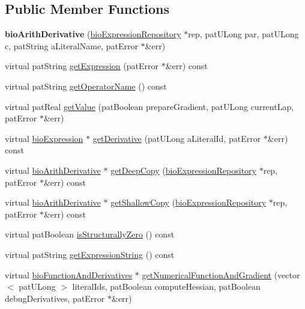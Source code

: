 \subsection*{Public Member Functions}
\begin{DoxyCompactItemize}
\item 
\mbox{\label{classbio_arith_derivative_a765e22a6898f15287928b1ef0758cca4}} 
{\bfseries bio\+Arith\+Derivative} (\hyperlink{classbio_expression_repository}{bio\+Expression\+Repository} $\ast$rep, pat\+U\+Long par, pat\+U\+Long c, pat\+String a\+Literal\+Name, pat\+Error $\ast$\&err)
\item 
virtual pat\+String \hyperlink{classbio_arith_derivative_a5cdf6c4903ec8123b30c0d2ce059718d}{get\+Expression} (pat\+Error $\ast$\&err) const
\item 
virtual pat\+String \hyperlink{classbio_arith_derivative_ac8efdaec7482845045144e134884769a}{get\+Operator\+Name} () const
\item 
virtual pat\+Real \hyperlink{classbio_arith_derivative_a332059cd224467b4a687d39ac705f269}{get\+Value} (pat\+Boolean prepare\+Gradient, pat\+U\+Long current\+Lap, pat\+Error $\ast$\&err)
\item 
virtual \hyperlink{classbio_expression}{bio\+Expression} $\ast$ \hyperlink{classbio_arith_derivative_a6a985cd2c3865e04a3ed54c11a88da17}{get\+Derivative} (pat\+U\+Long a\+Literal\+Id, pat\+Error $\ast$\&err) const
\item 
virtual \hyperlink{classbio_arith_derivative}{bio\+Arith\+Derivative} $\ast$ \hyperlink{classbio_arith_derivative_a9cbc5395703b23816d43580b5482f9f0}{get\+Deep\+Copy} (\hyperlink{classbio_expression_repository}{bio\+Expression\+Repository} $\ast$rep, pat\+Error $\ast$\&err) const
\item 
virtual \hyperlink{classbio_arith_derivative}{bio\+Arith\+Derivative} $\ast$ \hyperlink{classbio_arith_derivative_a37dadf7fcbcfe40bedb900926f3fe974}{get\+Shallow\+Copy} (\hyperlink{classbio_expression_repository}{bio\+Expression\+Repository} $\ast$rep, pat\+Error $\ast$\&err) const
\item 
virtual pat\+Boolean \hyperlink{classbio_arith_derivative_a8de59d734f7c023570046dd184d71a82}{is\+Structurally\+Zero} () const
\item 
virtual pat\+String \hyperlink{classbio_arith_derivative_ae2e8d614fcf2e46d43759c6bab201f30}{get\+Expression\+String} () const
\item 
virtual \hyperlink{classbio_function_and_derivatives}{bio\+Function\+And\+Derivatives} $\ast$ \hyperlink{classbio_arith_derivative_afaa0e62675cc46145231f3e01d38f06a}{get\+Numerical\+Function\+And\+Gradient} (vector$<$ pat\+U\+Long $>$ literal\+Ids, pat\+Boolean compute\+Hessian, pat\+Boolean debug\+Derivatives, pat\+Error $\ast$\&err)
\end{DoxyCompactItemize}
